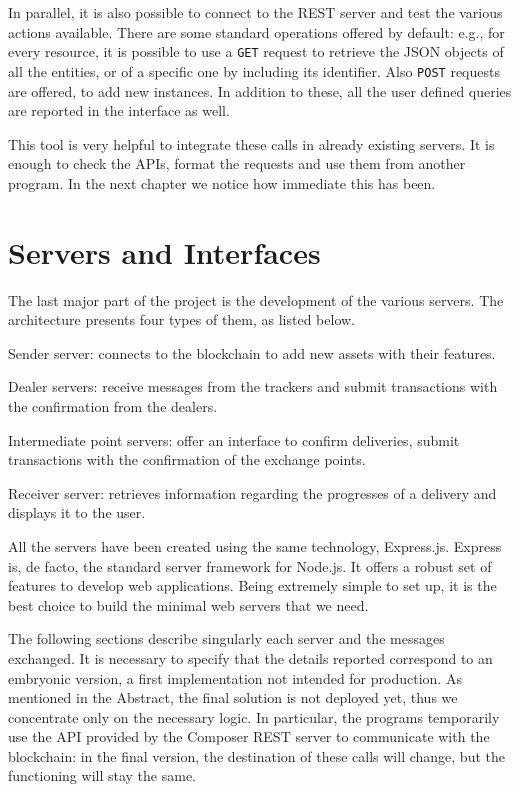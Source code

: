 In parallel, it is also possible to connect to the REST server and test the various actions available. There are some standard operations offered by default: e.g., for every resource, it is possible to use a \texttt{GET} request to retrieve the JSON objects of all the entities, or of a specific one by including its identifier. Also \texttt{POST} requests are offered, to add new instances. In addition to these, all the user defined queries are reported in the interface as well.

This tool is very helpful to integrate these calls in already existing servers. It is enough to check the APIs, format the requests and use them from another program. In the next chapter we notice how immediate this has been.


\chapter{Servers and Interfaces}
\label{cha:servers}
The last major part of the project is the development of the various servers. The architecture presents four types of them, as listed below.

\begin{description}
    \item Sender server: connects to the blockchain to add new assets with their features.
    \item Dealer servers: receive messages from the trackers and submit transactions with the confirmation from the dealers.
    \item Intermediate point servers: offer an interface to confirm deliveries, submit transactions with the confirmation of the exchange points.
    \item Receiver server: retrieves information regarding the progresses of a delivery and displays it to the user.
\end{description}

All the servers have been created using the same technology, Express.js. Express is, de facto, the standard server framework for Node.js. It offers a robust set of features to develop web applications. Being extremely simple to set up, it is the best choice to build the minimal web servers that we need.

The following sections describe singularly each server and the messages exchanged. It is necessary to specify that the details reported correspond to an embryonic version, a first implementation not intended for production. As mentioned in the Abstract, the final solution is not deployed yet, thus we concentrate only on the necessary logic. In particular, the programs temporarily use the API provided by the Composer REST server to communicate with the blockchain: in the final version, the destination of these calls will change, but the functioning will stay the same.

